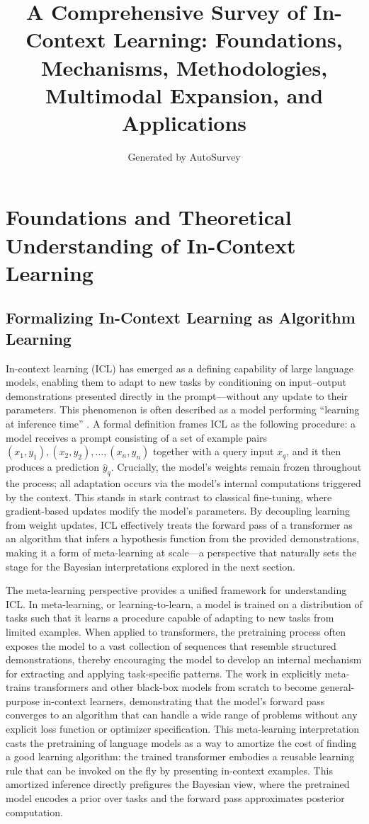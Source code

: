 \documentclass[11pt]{article}
\title{A Comprehensive Survey of In-Context Learning: Foundations, Mechanisms, Methodologies, Multimodal Expansion, and Applications}
\author{Generated by AutoSurvey}
\date{}
\begin{document}
\maketitle
\tableofcontents
\newpage

\section{Foundations and Theoretical Understanding of In-Context Learning}

\subsection{Formalizing In-Context Learning as Algorithm Learning}

In-context learning (ICL) has emerged as a defining capability of large language models, enabling them to adapt to new tasks by conditioning on input--output demonstrations presented directly in the prompt---without any update to their parameters. This phenomenon is often described as a model performing ``learning at inference time'' \cite{ref1,ref2}. A formal definition frames ICL as the following procedure: a model receives a prompt consisting of a set of example pairs \((x_1, y_1), (x_2, y_2), \dots, (x_n, y_n)\) together with a query input \(x_q\), and it then produces a prediction \(\hat{y}_q\). Crucially, the model's weights remain frozen throughout the process; all adaptation occurs via the model's internal computations triggered by the context. This stands in stark contrast to classical fine-tuning, where gradient-based updates modify the model's parameters. By decoupling learning from weight updates, ICL effectively treats the forward pass of a transformer as an algorithm that infers a hypothesis function from the provided demonstrations, making it a form of meta-learning at scale---a perspective that naturally sets the stage for the Bayesian interpretations explored in the next section.

The meta-learning perspective provides a unified framework for understanding ICL. In meta-learning, or learning-to-learn, a model is trained on a distribution of tasks such that it learns a procedure capable of adapting to new tasks from limited examples. When applied to transformers, the pretraining process often exposes the model to a vast collection of sequences that resemble structured demonstrations, thereby encouraging the model to develop an internal mechanism for extracting and applying task-specific patterns. The work in \cite{ref3} explicitly meta-trains transformers and other black-box models from scratch to become general-purpose in-context learners, demonstrating that the model's forward pass converges to an algorithm that can handle a wide range of problems without any explicit loss function or optimizer specification. This meta-learning interpretation casts the pretraining of language models as a way to amortize the cost of finding a good learning algorithm: the trained transformer embodies a reusable learning rule that can be invoked on the fly by presenting in-context examples. This amortized inference directly prefigures the Bayesian view, where the pretrained model encodes a prior over tasks and the forward pass approximates posterior computation.
\end{document}
